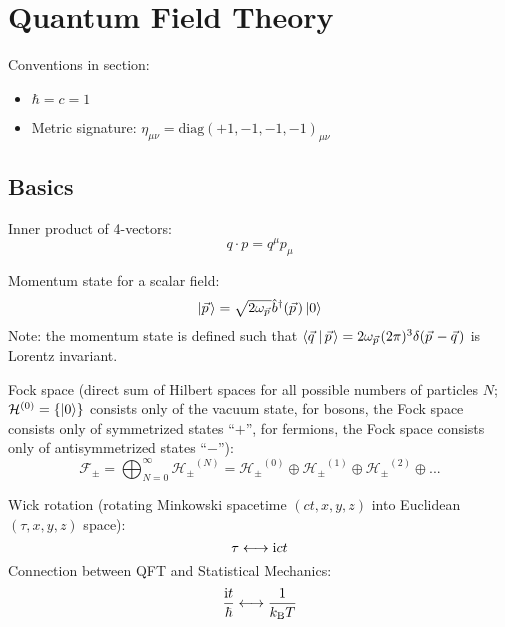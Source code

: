 \section{Quantum Field Theory} %

	Conventions in section:
	\begin{itemize}
		\item $\hbar = c = 1$
		\item Metric signature: $\eta_{\mu\nu} = \mathrm{diag}(+1,-1,-1,-1)_{\mu\nu}$
	\end{itemize}


	\subsection{Basics}
		\noindent
		Inner product of 4-vectors:
		\begin{equation}
			q \cdot p = q^\mu p_\mu
		\end{equation}

		\noindent
		Momentum state for a scalar field:
		\begin{equation}
			\Ket{\vec{p}} = \sqrt{2 \omega_{\vec{p}}} \hat{b}^\dagger(\vec{p}) \Ket{0}
		\end{equation}
		Note: the momentum state is defined such that $\Braket{\vec{q}|\vec{p}} = 2\omega_{\vec{p}} (2\pi)^3 \delta(\vec{p}-\vec{q})$ is Lorentz invariant.

		\noindent
		Fock space (direct sum of Hilbert spaces for all possible numbers of particles $N$; $\mathcal{H}^{(0)} = \qty{\Ket{0}}$ consists only of the vacuum state, for bosons, the Fock space consists only of symmetrized states ``$+$'', for fermions, the Fock space consists only of antisymmetrized states ``$-$''):
		\begin{equation}
			\mathcal{F_\pm}
			= \bigoplus_{N=0}^{\infty} \mathcal{H_\pm}^{(N)}
			= \mathcal{H_\pm}^{(0)} \oplus \mathcal{H_\pm}^{(1)} \oplus \mathcal{H_\pm}^{(2)} \oplus ...
		\end{equation}

		\noindent
		Wick rotation (rotating Minkowski spacetime $(c t,x,y,z)$ into Euclidean $(\tau,x,y,z)$ space):
		\begin{equation}
			\tau \longleftrightarrow \mathrm{i} c t
		\end{equation}
		Connection between QFT and Statistical Mechanics:
		\begin{equation}
			\frac{\mathrm{i} t}{\hbar} \longleftrightarrow \frac{1}{k_{\text{B}} T}
		\end{equation}

